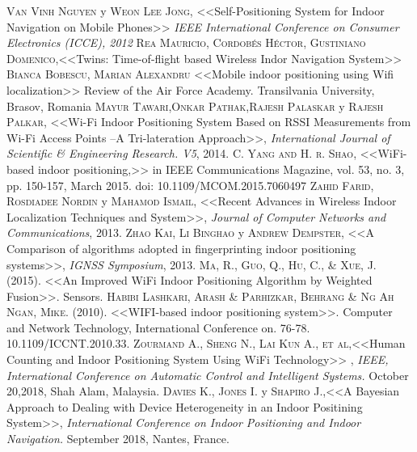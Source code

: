 \documentclass[12pt]{report}
\begin{document}
\begin{thebibliography}{X}
 \textsc{Van Vinh Nguyen} y \textsc{Weon Lee Jong}, <<Self-Positioning System for Indoor Navigation on Mobile Phones>> \textit{IEEE International Conference on Consumer Electronics (ICCE), 2012}
 \textsc{Rea Mauricio, Cordobés Héctor, Gustiniano Domenico},<<Twins: Time-of-flight based Wireless Indor Navigation System>>
 \textsc{Bianca Bobescu, Marian Alexandru} <<Mobile indoor positioning using Wifi localization>> Review of the Air Force Academy. Transilvania University, Brasov, Romania
 \textsc{Mayur Tawari},\textsc{Onkar Pathak},\textsc{Rajesh Palaskar} y \textsc{Rajesh Palkar}, <<Wi-Fi Indoor Positioning System Based on RSSI Measurements from Wi-Fi Access Points –A Tri-lateration Approach>>, \textit{International Journal of Scientific \& Engineering Research. V5}, 2014.
 \textsc{C. Yang and H. r. Shao}, <<WiFi-based indoor positioning,>> in IEEE Communications Magazine, vol. 53, no. 3, pp. 150-157, March 2015. doi: 10.1109/MCOM.2015.7060497
 \textsc{Zahid Farid, Rosdiadee Nordin} y \textsc{Mahamod Ismail}, <<Recent Advances in Wireless Indoor Localization Techniques and System>>, \textit{Journal of Computer Networks and Communications}, 2013.
 \textsc{Zhao Kai, Li Binghao} y \textsc{Andrew Dempster}, <<A Comparison of algorithms adopted in fingerprinting indoor positioning systems>>, \textit{IGNSS Symposium}, 2013.
 \textsc{Ma, R., Guo, Q., Hu, C., \& Xue, J.} (2015). <<An Improved WiFi Indoor Positioning Algorithm by Weighted Fusion>>. Sensors.
 \textsc{Habibi Lashkari, Arash \& Parhizkar, Behrang \& Ng Ah Ngan, Mike.} (2010). <<WIFI-based indoor positioning system>>. Computer and Network Technology, International Conference on. 76-78. 10.1109/ICCNT.2010.33. 
 \textsc{Zourmand A., Sheng N., Lai Kun A., et al},<<Human Counting and Indoor Positioning System Using WiFi Technology>> , \textit{IEEE, International Conference on Automatic Control and Intelligent Systems.} October 20,2018, Shah Alam, Malaysia.
 \textsc{Davies K., Jones I.} y \textsc{Shapiro J.},<<A Bayesian Approach to Dealing with Device Heterogeneity in an Indoor Positining System>>, \textit{International Conference on Indoor Positioning and Indoor Navigation.} September 2018, Nantes, France.


\end{thebibliography}
\end{document}
